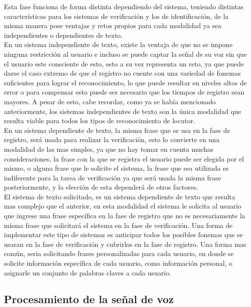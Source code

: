 Esta fase funciona de forma distinta dependiendo del sistema, teniendo distintas caracter\'isticas para los sistemas de verificaci\'on y los de identificaci\'on, de la misma manera pose ventajas y retos propios para cada modalidad ya sea independientes o dependientes de texto.\\

En un sistema independiente de texto, existe la ventaja de que no se impone ninguna restricci\'on al usuario e incluso se puede captar la señal de su voz sin que el usuario este consciente de esto, esto a su vez representa un reto, ya que puede darse el caso extremo de que el registro no cuente con una variedad de fonemas suficientes para lograr el reconocimiento, lo que puede resultar en niveles altos de error o para compensar esto puede ser necesario que los tiempos de registro sean mayores. A pesar de esto, cabe recordar, como ya se hab\'ia mencionado anteriormente, los sistemas independientes de texto son la \'unica modalidad que resulta viable para todos los tipos de reconocimiento de locutor.\\

En un sistema dependiente de texto, la misma frase que se usa en la fase de registro, ser\'a usada para realizar la verificaci\'on, esto lo convierte en una modalidad de las mas simples, ya que no hay tomar en cuenta muchas consideraciones, la frase con la que se registra el usuario puede ser elegida por el mismo, o alguna frase que le solicite el sistema, la frase que sea utilizada es indiferente para la tarea de verificaci\'on ya que ser\'a usada la misma frase posteriormente, y la elecci\'on de esta depender\'a de otros factores.\\

El sistema de texto solicitado, es un sistema dependiente de texto que resulta mas complejo que el anterior, en esta modalidad el sistema le solicita al usuario que ingrese una frase espec\'ifica en la fase de registro que no es necesariamente la misma frase que solicitar\'a el sistema en la fase de verificaci\'on. Una forma de implementar este tipo de sistemas es anticipar todos los posibles fonemas que se usaran en la fase de verificaci\'on y cubrirlos en la fase de registro. Una forma mas com\'un, seria solicitando frases personalizadas para cada usuario, en donde se solicite informaci\'on espec\'ifica de cada usuario, como informaci\'on personal, o asignarle un conjunto de palabras claves a cada usuario.\\

\subsection{Procesamiento de la señal de voz}

